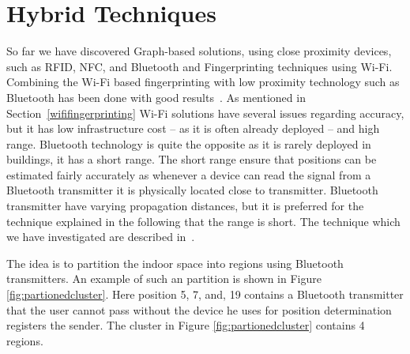 \section{Hybrid Techniques}
So far we have discovered Graph-based solutions, using close proximity devices, such as RFID, NFC, and Bluetooth and Fingerprinting techniques using Wi-Fi. 
Combining the Wi-Fi based fingerprinting with low proximity technology such as Bluetooth has been done with good results~\cite{6068444}.
As mentioned in Section~\ref{wififingerprinting} Wi-Fi solutions have several issues regarding accuracy, but it has low infrastructure cost -- as it is often already deployed -- and high range. 
Bluetooth technology is quite the opposite as it is rarely deployed in buildings, it has a short range. 
The short range ensure that positions can be estimated fairly accurately as whenever a device can read the signal from a Bluetooth transmitter it is physically located close to transmitter. 
Bluetooth transmitter have varying propagation distances, but it is preferred for the technique explained in the following that the range is short. 
The technique which we have investigated are described in~\cite{6068444}.

The idea is to partition the indoor space into regions using Bluetooth transmitters.
An example of such an partition is shown in Figure \ref{fig:partionedcluster}. 
Here position 5, 7, and, 19 contains a Bluetooth transmitter that the user cannot pass without the device he uses for position determination registers the sender. 
The cluster in Figure \ref{fig:partionedcluster} contains 4 regions. 

